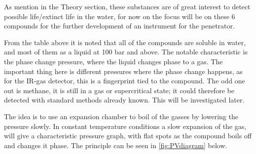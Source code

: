 \begin{table}
\end{table}

As mention in the Theory section, these substances are of great interest to detect possible life/extinct life in the water, for now on the focus will be on these 6 compounds for the further development of an instrument for the penetrator.

From the table above it is noted that all of the compounds are soluble in water, and most of them as a liquid at 100 bar and above. The notable characteristic is the phase change pressure, where the liquid changes phase to a gas. The important thing here is different pressures where the phase change happens, as for the IR-gas detector, this is a fingerprint tied to the compound. The odd one out is methane, it is still in a gas or supercritical state; it could therefore be detected with standard methods already known.  This will be investigated later.

The idea is to use an expansion chamber to boil of the gasses by lowering the pressure slowly. In constant temperature conditions a slow expansion of the gas, will give a characteristic pressure graph, with flat spots as the compound boils off and changes it phase. The principle can be seen in \ref{fig:PVdiagram} below.

